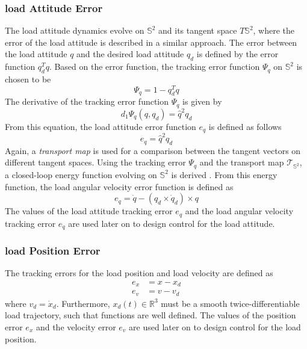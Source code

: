\subsubsection*{load Attitude Error}
The load attitude dynamics evolve on $ \mathbb{S}^2 $ and its tangent space $ T\mathbb{S}^2 $, where the error of the load attitude is described in a similar approach.
The error between the load attitude $ q $ and the desired load attitude $ q_d $ is defined by the error function $ q_d^Tq $. Based on the error function, the tracking error function $ \Psi_q $ on $ \mathbb{S}^2 $ is chosen to be
\begin{equation}\label{eq:psiq}
\Psi_q=1-q_d^Tq
\end{equation}
The derivative of the tracking error function $ \Psi_q $ is given by 
\begin{equation}\label{key}
d_1\Psi_q(q,q_d)=\hat{q}^2q_d
\end{equation}
From this equation, the load attitude error function $ e_q $ is defined as follows
\begin{equation}\label{eq:con.eq}
e_q=\hat{q}^2q_d
\end{equation}
Again, a \textit{transport map} is used for a comparison between the tangent vectors on different tangent spaces.
Using the tracking error $ \Psi_q $ and the transport map $ \mathcal{T}_{\mathbb{S}^2} $, a closed-loop energy function evolving on $ \mathbb{S}^2 $ is derived \cite[11.3.2]{Bullo2005}. From this energy function, the load angular velocity error function is defined as
\begin{equation}\label{eq:con.edq}
e_{\dot{q}}=\dot{q}-(q_d\times\dot{q}_d)\times q
\end{equation}
The values of the load attitude tracking error $ e_q $ and the load angular velocity tracking error $ e_{\dot{q}}$ 
are used later on to design control for the load attitude.

\subsubsection*{load Position Error}
The tracking errors for the load position and load velocity are defined as
\begin{align}\label{key}
e_x&=x-x_d\\
e_v&=v-v_d
\end{align}
where $ v_d=\dot{x}_d $. Furthermore, $ x_d(t) \in \mathbb{R}^3$ must be a smooth twice-differentiable load trajectory, such that functions are well defined. The values of the position error $ e_x$ and the velocity error $ e_v $ are used later on to design control for the load position.

